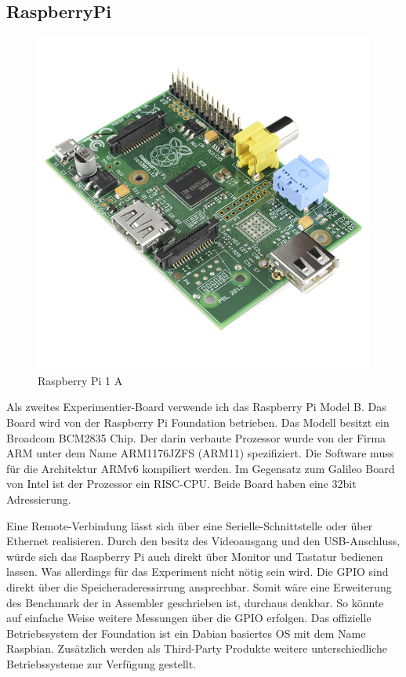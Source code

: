 \subsection{RaspberryPi}


\begin{figure}
\centering
\includegraphics[scale=0.4]{raspberry-pi-2.png}
\caption{Raspberry Pi 1 A\cite{raspberry_image}}
\label{fig:Raspberry Pi 1 A}
\end{figure}


Als zweites Experimentier-Board verwende ich das Raspberry Pi Model B\cite{raspberry_foundation}. Das Board wird von der Raspberry Pi Foundation betrieben. Das Modell besitzt ein Broadcom BCM2835\cite{broadcom_datasheet} Chip. Der darin verbaute Prozessor wurde von der Firma ARM unter dem Name ARM1176JZFS\cite{arm_datasheet} (ARM11) spezifiziert. Die Software muss für die Architektur ARMv6 kompiliert werden. Im Gegensatz zum Galileo Board von Intel ist der Prozessor ein RISC-CPU. Beide Board haben eine 32bit Adressierung.
\par
Eine Remote-Verbindung lässt sich über eine Serielle-Schnittstelle oder über Ethernet realisieren. Durch den besitz des Videoausgang und den USB-Anschluss, würde sich das Raspberry Pi auch direkt über Monitor und Tastatur bedienen lassen. Was allerdings für das Experiment nicht nötig sein wird. Die GPIO sind direkt über die Speicheraderessirrung ansprechbar. Somit wäre eine Erweiterung des Benchmark der in Assembler geschrieben ist, durchaus denkbar. So könnte auf einfache Weise weitere Messungen über die GPIO erfolgen. Das offizielle Betriebssystem der Foundation ist ein Dabian basiertes OS mit dem Name Raspbian. Zusätzlich werden als Third-Party Produkte weitere unterschiedliche Betriebssysteme zur Verfügung gestellt. 











